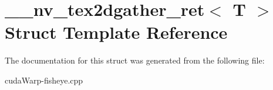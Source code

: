 \hypertarget{struct____nv__tex2dgather__ret}{}\section{\+\_\+\+\_\+nv\+\_\+tex2dgather\+\_\+ret$<$ T $>$ Struct Template Reference}
\label{struct____nv__tex2dgather__ret}


The documentation for this struct was generated from the following file\+:\begin{DoxyCompactItemize}
\item 
cuda\+Warp-\/fisheye.\+cpp\end{DoxyCompactItemize}
